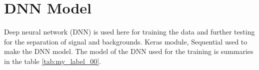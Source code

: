 












\section{DNN Model}
Deep neural network (DNN) is used here for training the data and further testing for the separation of signal and backgrounds. Keras module\cite{ml_1807}, Sequential\cite{ml_2}\cite{ml_3} used to make the DNN model. The model of the DNN used for the training is summaries in the table \autoref{tab:my_label_00}. 

